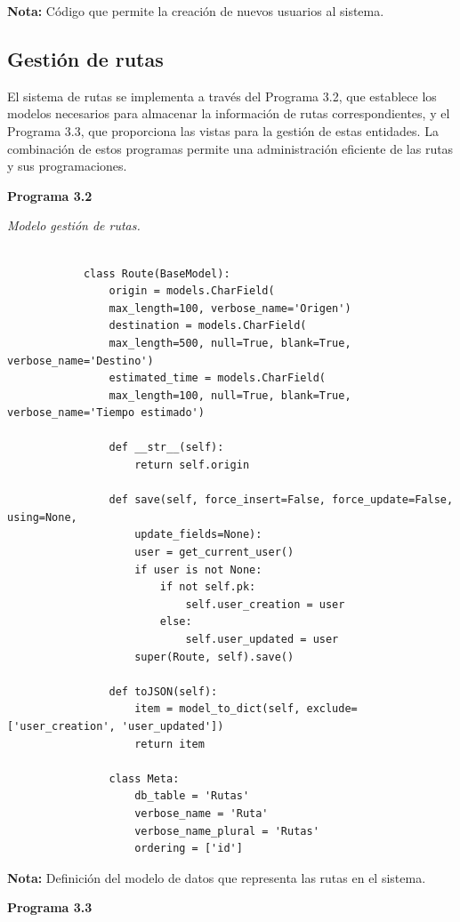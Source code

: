 	\textbf{Nota:} Código que permite la creación de nuevos usuarios al sistema.
	
	\subsection{Gestión de rutas}
	
		El sistema de rutas se implementa a través del Programa 3.2, que establece los modelos necesarios para almacenar la información de rutas correspondientes, y el Programa 3.3, que proporciona las vistas para la gestión de estas entidades. La combinación de estos programas permite una administración eficiente de las rutas y sus programaciones.
		
		\textbf{Programa 3.2}
		
		\textit{Modelo gestión de rutas.} %
		\vspace{0.3cm} %
		\begin{lstlisting}[lineskip=-1pt]
			
			class Route(BaseModel):
				origin = models.CharField(
				max_length=100, verbose_name='Origen')
				destination = models.CharField(
				max_length=500, null=True, blank=True, verbose_name='Destino')
				estimated_time = models.CharField(
				max_length=100, null=True, blank=True, verbose_name='Tiempo estimado')
				
				def __str__(self):
					return self.origin
				
				def save(self, force_insert=False, force_update=False, using=None,
					update_fields=None):
					user = get_current_user()
					if user is not None:
						if not self.pk:
							self.user_creation = user
						else:
							self.user_updated = user
					super(Route, self).save()
				
				def toJSON(self):
					item = model_to_dict(self, exclude=['user_creation', 'user_updated'])
					return item
				
				class Meta:
					db_table = 'Rutas'
					verbose_name = 'Ruta'
					verbose_name_plural = 'Rutas'
					ordering = ['id']
		\end{lstlisting}
		
		\textbf{Nota:} Definición del modelo de datos que representa las rutas en el sistema.
		
		\vspace{1cm}
		
		\textbf{Programa 3.3}
		
